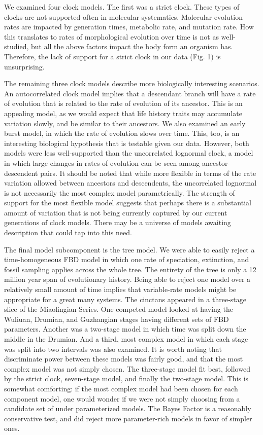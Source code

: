 \documentclass{article}
\begin{document}
We examined four clock models.
The first was a strict clock. 
These types of clocks are not supported often in molecular systematics.
Molecular evolution rates are impacted by generation times,  metabolic rate, and mutation rate.
How this translates to rates of morphological evolution over time is not as well-studied, but all the above factors impact the body form an organism has.
Therefore, the lack of support for a strict clock in our data (Fig. 1) is unsurprising.

The remaining three clock models describe more biologically interesting scenarios.
An autocorrelated clock model implies that a descendant branch will have a rate of evolution that is related to the rate of evolution of its ancestor.
This is an appealing model, as we would expect that life history traits may accumulate variation slowly, and be similar to their ancestors. 
We also examined an early burst model, in which the rate of evolution slows over time.
This, too, is an interesting biological hypothesis that is testable given our data.
However, both models were less well-supported than the uncorrelated lognormal clock,
a model in which large changes in rates of evolution can be seen among ancestor-descendent pairs.
It should be noted that while more flexible in terms of the rate variation allowed between ancestors and descendents, the uncorrelated lognormal is not necessarily the most complex model parametrically. 
The strength of support for the most flexible model suggests that perhaps there is a substantial amount of variation that is not being currently captured by our current generations of clock models.
There may be a universe of models awaiting description that could tap into this need.

The final model subcomponent is the tree model.
We were able to easily reject a time-homogeneous FBD model in which one rate of speciation, extinction, and fossil sampling applies across the whole tree.
The entirety of the tree is only a 12 million year span of evolutionary history.
Being able to reject one model over a relatively small amount of time implies that variable-rate models might be appropriate for a great many systems.
The cinctans appeared in a three-stage slice of the Miaolingian Series. 
One competed model looked at having the Wuliuan, Drumian, and Guzhangian stages having different sets of FBD parameters. 
Another was  a two-stage model in which time was split down the middle in the Drumian.
And a third, most complex model in which each stage was split into two intervals was also examined. 
It is worth noting that discriminate power between these models was fairly good, and that the most complex model was not simply chosen.
The three-stage model fit best, followed by the strict clock, seven-stage model, and finally the two-stage model. 
This is somewhat comforting: if the most complex model had been chosen for each component model, one would wonder if we were not simply choosing from a candidate set of under parameterized models. 
The Bayes Factor is a reasonably conservative test, and did reject more parameter-rich models in favor of simpler ones.
\end{document}
